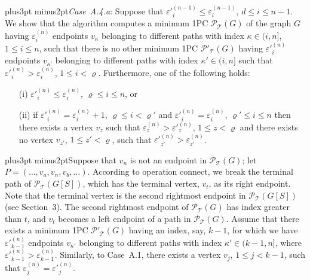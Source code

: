 \documentclass[10pt]{article}
\def\yskip{\penalty-50\vskip3pt plus3pt minus2pt}
\def\y{\yskip}
\begin{document}
{\y \textit{Case~A.4.a}: Suppose that $\varepsilon'^{(n-1)}_i \leq
\varepsilon^{(n-1)}_i$, $d \leq i \leq n-1$. We show that the
algorithm computes a minimum 1PC $\mathcal{P_{\mathcal{T}}}(G)$ of
the graph $G$ having $\varepsilon^{(n)}_i$ endpoints $v_\kappa$
belonging to different paths with index $\kappa \in (i,n]$, $1
\leq i \leq n$, such that there is no other minimum 1PC
$\mathcal{P'_{\mathcal{T}}}(G)$ having $\varepsilon'^{(n)}_i$
endpoints $v_{\kappa'}$ belonging to different paths with index
$\kappa' \in (i,n]$ such that
$\varepsilon'^{(n)}_i>\varepsilon^{(n)}_i$, $1 \leq i < \varrho$.
Furthermore, one of the following holds:
\begin{itemize}
\item[(i)] $\varepsilon'^{(n)}_i \leq \varepsilon^{(n)}_i$,
$\varrho \leq i \leq n$, or \item[(ii)] if $\varepsilon'^{(n)}_i =
\varepsilon^{(n)}_i +1$, $\varrho \leq i < \varrho'$ and
$\varepsilon'^{(n)}_i = \varepsilon^{(n)}_i$, $\varrho' \leq i
\leq n$ then there exists a vertex $v_z$ such that
$\varepsilon^{(n)}_z > \varepsilon'^{(n)}_z$, $1 \leq z < \varrho$
and there exists no vertex $v_{z'}$, $1 \leq z' <\varrho$, such
that $\varepsilon'^{(n)}_{z'}>\varepsilon^{(n)}_{z'}$.

\end{itemize}

\y Suppose that $v_n$ is not an endpoint in
$\mathcal{P_{\mathcal{T}}}(G)$; let $P=(\ldots, v_{a}, v_n, v_{b},
\ldots)$. According to operation connect, we break the terminal
path of $\mathcal{P_{\mathcal{T}}}(G[S])$, which has the terminal
vertex, $v_t$, as its right endpoint. Note that the terminal
vertex is the second rightmost endpoint in
$\mathcal{P_{\mathcal{T}}}(G[S])$ (see Section~3). The second
rightmost endpoint of $\mathcal{P_{\mathcal{T}}}(G)$ has index
greater than $t$, and $v_t$ becomes a left endpoint of a path in
$\mathcal{P_{\mathcal{T}}}(G)$. Assume that there exists a minimum
1PC $\mathcal{P'_{\mathcal{T}}}(G)$ having an index, say, $k-1$,
for which we have $\varepsilon'^{(n)}_{k-1}$ endpoints
$v_{\kappa'}$ belonging to different paths with index $\kappa' \in
(k-1,n]$, where
$\varepsilon'^{(n)}_{k-1}>\varepsilon^{(n)}_{k-1}$. Similarly, to
Case~A.1, there exists a vertex $v_j$, $1 \leq j < k-1$, such that
$\varepsilon^{(n)}_j = \varepsilon'^{(n)}_j$.

}
\end{document}
